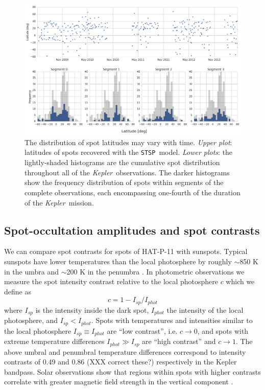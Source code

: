 \documentclass[iop]{emulateapj}
\newcommand{\stsp}{\texttt{STSP}}
\newcommand{\kepler}{\textit{Kepler}}
\begin{document}
\begin{figure}
\centering
\includegraphics[scale=0.6]{figures/latitude_distribution.png}
\caption{The distribution of spot latitudes may vary with time. \textit{Upper plot}: latitudes of spots recovered with the \stsp\ model. \textit{Lower plots}: the lightly-shaded histograms are the cumulative spot distribution throughout all of the \kepler\ observations. The darker histograms show the frequency distribution of spots within segments of the complete observations, each encompassing one-fourth of the duration of the \kepler\ mission.}
\label{fig:transit_gallery}
\end{figure}

\subsection{Spot-occultation amplitudes and spot contrasts} \label{sec:contrast}

We can compare spot contrasts for spots of HAT-P-11 with sunspots. Typical sunspots have lower temperatures than the local photosphere by roughly $\sim$850 K in the umbra and $\sim$200 K in the penumbra \citep{Eker2003}. In photometric observations we measure the spot intensity contrast relative to the local photosphere $c$ which we define as 
\begin{equation}
c = 1 - I_{sp}/I_{phot}
\end{equation}
where $I_{sp}$ is the intensity inside the dark spot, $I_{phot}$ the intensity of the local photosphere, and $I_{sp} < I_{phot}$. Spots with temperatures and intensities similar to the local photosphere $I_{sp} \equiv I_{phot}$ are ``low contrast'', i.e. $c \rightarrow 0$, and spots with extreme temperature differences $I_{phot} \gg I_{sp}$ are ``high contrast'' and $c\rightarrow 1$. The above umbral and penumbral temperature differences correspond to intensity contrasts of 0.49 and 0.86 (XXX correct these?) respectively in the Kepler bandpass. Solar observations show that regions within spots with higher contrasts correlate with greater magnetic field strength in the vertical component \citep{Keppens1996, Leonard2008}.
\end{document}

